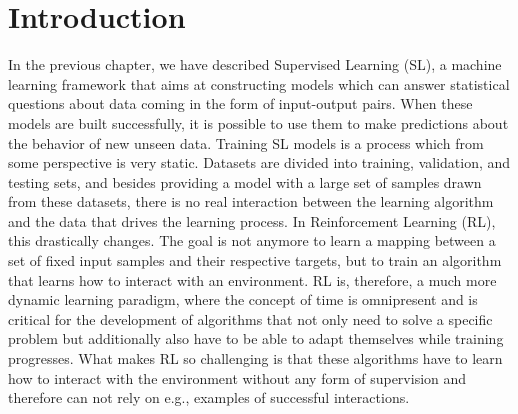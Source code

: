 \section{Introduction}
\label{sec:rl_introduction}
In the previous chapter, we have described Supervised Learning (SL), a machine learning framework that aims at constructing models which can answer statistical questions about data coming in the form of input-output pairs. When these models are built successfully, it is possible to use them to make predictions about the behavior of new unseen data. Training SL models is a process which from some perspective is very static. Datasets are divided into training, validation, and testing sets, and besides providing a model with a large set of samples drawn from these datasets, there is no real interaction between the learning algorithm and the data that drives the learning process. In Reinforcement Learning (RL), this drastically changes. The goal is not anymore to learn a mapping between a set of fixed input samples and their respective targets, but to train an algorithm that learns how to interact with an environment. RL is, therefore, a much more dynamic learning paradigm, where the concept of time is omnipresent and is critical for the development of algorithms that not only need to solve a specific problem but additionally also have to be able to adapt themselves while training progresses. What makes RL so challenging is that these algorithms have to learn how to interact with the environment without any form of supervision and therefore can not rely on e.g., examples of successful interactions. 

